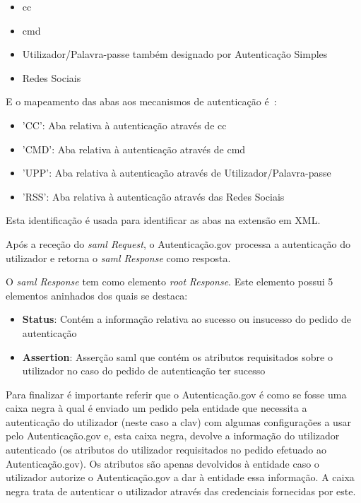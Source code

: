 \begin{itemize}
\begin{itemize}
            \begin{itemize}
                \item \acrlong{cc}
                \item \acrlong{cmd}
                \item Utilizador/Palavra-passe também designado por Autenticação Simples
                \item Redes Sociais
            \end{itemize}
            E o mapeamento das abas aos mecanismos de autenticação é~\cite{agov2}:
            \begin{itemize}
                \item 'CC': Aba relativa à autenticação através de \acrlong{cc}
                \item 'CMD': Aba relativa à autenticação através de \acrlong{cmd}
                \item 'UPP': Aba relativa à autenticação através de Utilizador/Palavra-passe
                \item 'RSS': Aba relativa à autenticação através das Redes Sociais
            \end{itemize}
            Esta identificação é usada para identificar as abas na extensão em XML.
    \end{itemize}
\end{itemize}

Após a receção do \textit{\acrshort{saml} Request}, o Autenticação.gov processa a autenticação do utilizador e retorna o \textit{\acrshort{saml} Response} como resposta.

O \textit{\acrshort{saml} Response} tem como elemento \textit{root} \textit{Response}.
Este elemento possui 5 elementos aninhados dos quais se destaca:
\begin{itemize}
    \item \textbf{Status}: Contém a informação relativa ao sucesso ou insucesso do pedido de autenticação
    \item \textbf{Assertion}: Asserção \acrshort{saml} que contém os atributos requisitados sobre o utilizador no caso do pedido de autenticação ter sucesso
\end{itemize}

Para finalizar é importante referir que o Autenticação.gov é como se fosse uma caixa negra à qual é enviado um pedido pela entidade que necessita a autenticação do utilizador (neste caso a \acrshort{clav}) com algumas configurações a usar pelo Autenticação.gov e, esta caixa negra, devolve a informação do utilizador autenticado (os atributos do utilizador requisitados no pedido efetuado ao Autenticação.gov). Os atributos são apenas devolvidos à entidade caso o utilizador autorize o Autenticação.gov a dar à entidade essa informação. A caixa negra trata de autenticar o utilizador através das credenciais fornecidas por este.

